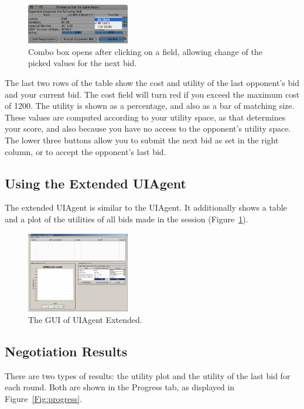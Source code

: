 \documentclass[]{article}
\begin{document}
{\begin{figure}[htb]
	\centering
	\includegraphics[width=0.4\textwidth]{media/image13.png}
\caption{Combo box opens after clicking on a field, allowing change of the picked values for the next bid.}
\end{figure}

	The last two rows of the table show the cost and utility of the last opponent's bid and your current bid. The cost field will turn red if you exceed the maximum cost of 1200. The utility is shown as a percentage, and also as a bar of matching size. These values are computed according to your utility space, as that determines your score, and also because you have no access to the opponent's utility space. The lower three buttons allow you to submit the next bid as set in the right column, or to accept the opponent's last bid.

	\subsection{Using the Extended UIAgent}

	The extended UIAgent is similar to the UIAgent. It additionally shows a table and a plot of the utilities of all bids made in the session (Figure~\ref{Fig:uiagent extended gui}).

\begin{figure}[htb]
	\centering
	\includegraphics[width=0.4\textwidth]{media/image14.png}
\caption{The GUI of UIAgent Extended.}\label{Fig:uiagent extended gui}
\end{figure}

\subsection{Negotiation Results}

There are two types of results: the utility plot and the utility of the last bid for each round. Both are shown in the Progress tab, as displayed in Figure~\ref{Fig:progress}.

}
\end{document}
